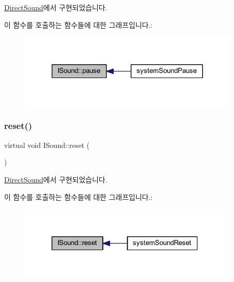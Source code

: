 \mbox{\hyperlink{class_direct_sound_a33ee46c99ddf8f06bd6605ec14798f4b}{Direct\+Sound}}에서 구현되었습니다.

이 함수를 호출하는 함수들에 대한 그래프입니다.\+:
\nopagebreak
\begin{figure}[H]
\begin{center}
\leavevmode
\includegraphics[width=299pt]{class_i_sound_a9fb848e0e31ab8bcd5384b0422855c3d_icgraph}
\end{center}
\end{figure}
\mbox{\label{class_i_sound_a7ca59c529f3abce2dd4ed8d8da243c5e}} 
\subsubsection{\texorpdfstring{reset()}{reset()}}
{\footnotesize\ttfamily virtual void I\+Sound\+::reset (\begin{DoxyParamCaption}{ }\end{DoxyParamCaption})\hspace{0.3cm}{\ttfamily [pure virtual]}}



\mbox{\hyperlink{class_direct_sound_aa947e57a1a67df3a609cd403b8c97bb8}{Direct\+Sound}}에서 구현되었습니다.

이 함수를 호출하는 함수들에 대한 그래프입니다.\+:
\nopagebreak
\begin{figure}[H]
\begin{center}
\leavevmode
\includegraphics[width=292pt]{class_i_sound_a7ca59c529f3abce2dd4ed8d8da243c5e_icgraph}
\end{center}
\end{figure}
\mbox{\label{class_i_sound_a8e0adea68f52a7f0392a3988a558aaf0}} 
